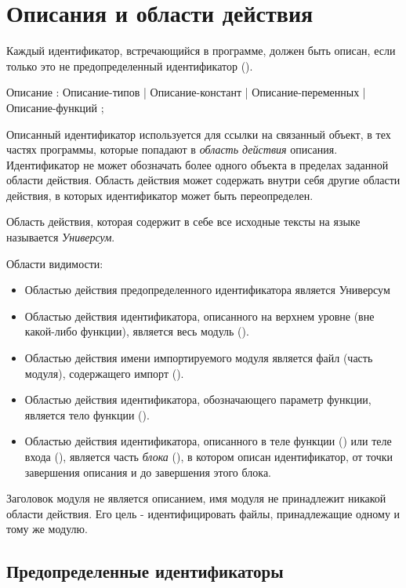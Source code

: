 \hypertarget{decls}{%
\section{Описания и области действия}\label{decls:chapter}}

Каждый идентификатор, встречающийся в программе, должен быть описан, если только это
не предопределенный идентификатор ().

\begin{Grammar}
Описание
	: Описание-типов
	| Описание-констант
	| Описание-переменных
	| Описание-функций
	;
\end{Grammar} 

Описанный идентификатор используется для ссылки на связанный объект, в тех частях программы, которые попадают в \emph{область действия} описания. 
Идентификатор не может обозначать более одного объекта в пределах заданной области действия. 
Область действия может содержать внутри себя другие области действия, в которых идентификатор может быть переопределен.

Область действия, которая содержит в себе все исходные тексты на языке \thelang{} называется \emph{Универсум}.

Области видимости:
\begin{itemize}
\item
Областью действия предопределенного идентификатора является Универсум
\item
Областью действия идентификатора, описанного на верхнем уровне (вне какой-либо функции), является весь модуль ().
\item
Областью действия имени импортируемого модуля является файл (часть модуля), содержащего импорт ().
\item
Областью действия идентификатора, обозначающего параметр функции, является тело функции ().
\item
Областью действия идентификатора, описанного в теле функции () или теле входа (), является часть \emph{блока} (), в котором описан идентификатор, от точки завершения описания и до завершения этого блока. 
\end{itemize}

Заголовок модуля не является описанием, имя модуля не принадлежит никакой области действия. Его цель - идентифицировать файлы, принадлежащие одному и тому же модулю.

\hypertarget{predefined-idents}{%
\subsection{Предопределенные идентификаторы}\label{decls:predefined-idents}}

